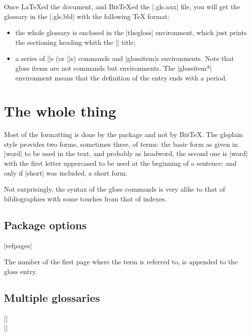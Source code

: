 \documentclass{ltxguide}
\newcommand{\gloss}{\textsf{gloss}}
\newcommand{\bibTeX}{\textsc{Bib}\TeX}
\begin{document}
Once \LaTeX{}ed the document, and \bibTeX{}ed the |.gls.aux| file,
you will get the glossary in the |.gls.bbl| with the following \TeX{}
format:
\begin{itemize}

\item the whole glossary is enclosed in the |thegloss| environment,
  which just prints the sectioning heading whith the |\glossname| title;

\item a series of |\glossheading|s (or |\glossgroup|s) commands
  and |glossitem|s environments. Note that gloss items are not
  commands but environments. The |glossitem*| environment means that
  the definition of the entry ends with a period.

\end{itemize}

\section{The whole thing}

Most of the formatting is done by the package and not by \bibTeX. The 
\textsf{glsplain} style provides two forms, sometimes three, of 
terms: the basic form as given in |word| to be used in the text, 
and probably as headword, the second one is |word| with the first 
letter uppercased to be used at the beginning of a sentence; and only 
if |short| was included, a short form.

Not surprisingly, the syntax of the \gloss{} commands is very
alike to that of bibliographies with some touches from that
of indexes.

\subsection{Package options}

\begin{decl}
|refpages|
\end{decl}

The number of the first page where the term is referred to, is
appended to the gloss entry.

\subsection{Multiple glossaries}

\begin{decl}
|\makegloss|\\
||
\end{decl}
\end{document}
